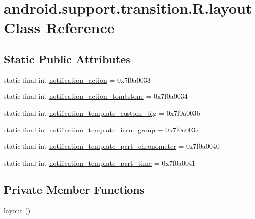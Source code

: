 \hypertarget{classandroid_1_1support_1_1transition_1_1_r_1_1layout}{}\section{android.\+support.\+transition.\+R.\+layout Class Reference}
\label{classandroid_1_1support_1_1transition_1_1_r_1_1layout}
\subsection*{Static Public Attributes}
\begin{DoxyCompactItemize}
\item 
static final int \mbox{\hyperlink{classandroid_1_1support_1_1transition_1_1_r_1_1layout_a3134dda494a06cd67a831ff544ed3794}{notification\+\_\+action}} = 0x7f0a0033
\item 
static final int \mbox{\hyperlink{classandroid_1_1support_1_1transition_1_1_r_1_1layout_add1ee4fa5428d4691c03956d3e88f746}{notification\+\_\+action\+\_\+tombstone}} = 0x7f0a0034
\item 
static final int \mbox{\hyperlink{classandroid_1_1support_1_1transition_1_1_r_1_1layout_ad75a504838c07c3ddefc6665e6a00f3a}{notification\+\_\+template\+\_\+custom\+\_\+big}} = 0x7f0a003b
\item 
static final int \mbox{\hyperlink{classandroid_1_1support_1_1transition_1_1_r_1_1layout_a64b8e888e8b70c0d633e86bb6c90393f}{notification\+\_\+template\+\_\+icon\+\_\+group}} = 0x7f0a003c
\item 
static final int \mbox{\hyperlink{classandroid_1_1support_1_1transition_1_1_r_1_1layout_a7a65ce710da544bde7dcf66de2a35a68}{notification\+\_\+template\+\_\+part\+\_\+chronometer}} = 0x7f0a0040
\item 
static final int \mbox{\hyperlink{classandroid_1_1support_1_1transition_1_1_r_1_1layout_aa67b5ed098ab3763d52f82b3e2edd7b3}{notification\+\_\+template\+\_\+part\+\_\+time}} = 0x7f0a0041
\end{DoxyCompactItemize}
\subsection*{Private Member Functions}
\begin{DoxyCompactItemize}
\item 
\mbox{\hyperlink{classandroid_1_1support_1_1transition_1_1_r_1_1layout_a4699b98da7446f37c94d9e84c76ef1a9}{layout}} ()
\end{DoxyCompactItemize}


